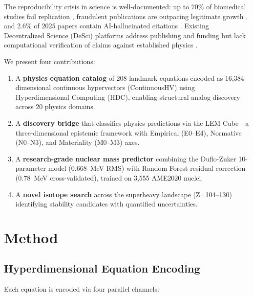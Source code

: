 \documentclass[letterpaper,11pt]{article}
\begin{document}
The reproducibility crisis in science is well-documented: up to 70\% of
biomedical studies fail replication \citep{ioannidis2005}, fraudulent
publications are outpacing legitimate growth \citep{nature2025fraud}, and 2.6\%
of 2025 papers contain AI-hallucinated citations \citep{nature2026citations}.
Existing Decentralized Science (DeSci) platforms address publishing and funding
but lack computational verification of claims against established physics
\citep{desci2025frontier}.

We present four contributions:

\begin{enumerate}
\item A \textbf{physics equation catalog} of 208 landmark equations encoded as
      16,384-dimensional continuous hypervectors (ContinuousHV) using
      Hyperdimensional Computing (HDC), enabling structural analog discovery
      across 20 physics domains.

\item A \textbf{discovery bridge} that classifies physics predictions via the
      LEM Cube---a three-dimensional epistemic framework with Empirical (E0--E4),
      Normative (N0--N3), and Materiality (M0--M3) axes.

\item A \textbf{research-grade nuclear mass predictor} combining the Duflo-Zuker
      10-parameter model (0.668~MeV RMS) with Random Forest residual correction
      (0.78~MeV cross-validated), trained on 3,555 AME2020 nuclei.

\item A \textbf{novel isotope search} across the superheavy landscape
      (Z=104--130) identifying stability candidates with quantified uncertainties.
\end{enumerate}

\section{Method}

\subsection{Hyperdimensional Equation Encoding}

Each equation is encoded via four parallel channels:
\end{document}
